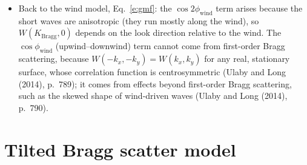 \documentclass[11pt, oneside]{article}
\begin{document}
\begin{itemize}
	\item Back to the wind model, Eq.~\ref{e:gmf}: the $\cos2\phi_\mathrm{wind}$ term arises because the short waves are anisotropic (they run mostly along the wind), so $W(K_\mathrm{Bragg},0)$ depends on the look direction relative to the wind. The $\cos\phi_\mathrm{wind}$ (upwind--downwind) term cannot come from first-order Bragg scattering, because $W(-k_x,-k_y) = W(k_x,k_y)$ for any real, stationary surface, whose correlation function is centrosymmetric (Ulaby and Long (2014), p.~789); it comes from effects beyond first-order Bragg scattering, such as the skewed shape of wind-driven waves (Ulaby and Long (2014), p.~790).
\end{itemize}

\section{Tilted Bragg scatter model}
\label{s:tilted}
\end{document}
